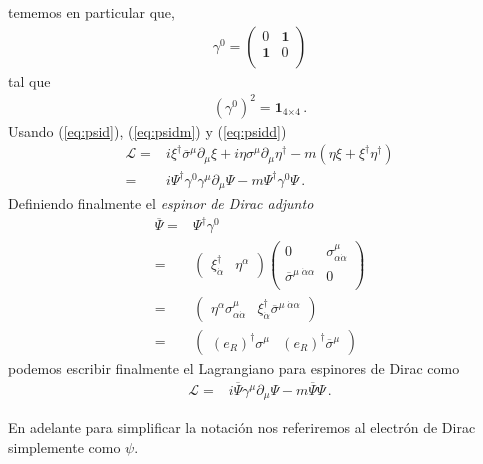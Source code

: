 \begin{frame}
tememos en particular que, 
\begin{align}
  \gamma^0= \begin{pmatrix}
    0           &\boldsymbol{1}\\
    \boldsymbol{1} &0\\
  \end{pmatrix}
\end{align}
tal que
\begin{align}
  \left( \gamma^{0} \right)^2=\boldsymbol{1}_{\text{4$\times 4$}}\,.
\end{align}
Usando (\ref{eq:psid}), (\ref{eq:psidm}) y (\ref{eq:psidd})
\begin{align}
  \mathcal{L}=&i\xi^{\dagger}\overline{\sigma}^{\mu}\partial_{\mu}\xi+i\eta\sigma^{\mu}\partial_{\mu}\eta^{\dagger}
-m \left(\eta\xi+\xi^{\dagger}\eta^{\dagger} \right)\nonumber\\
=&i\Psi^{\dagger}\gamma^{0}\gamma^{\mu}\partial_{\mu}\Psi-m\Psi^{\dagger}\gamma^{0}\Psi\,.
\end{align}
Definiendo finalmente el \emph{espinor de Dirac adjunto}
\begin{align}
  \overline{\Psi}=&\Psi^{\dagger}\gamma^{0}\\
     =& \begin{pmatrix}
  \xi^{\dagger}_{\dot{\alpha}}& \eta^{\alpha}
  \end{pmatrix}
\begin{pmatrix}
   0           &\sigma^{\mu}_{\alpha\dot{\alpha}}\\
    \overline{\sigma}^{\mu\;\dot{\alpha}\alpha} &0\\
  \end{pmatrix}\\
=& \begin{pmatrix}
  \eta^{\alpha}\sigma^{\mu}_{\alpha\dot{\alpha}}&
  \xi^{\dagger}_{\dot{\alpha}}\overline{\sigma}^{\mu\;\dot{\alpha}\alpha}
\end{pmatrix}\\
=& \begin{pmatrix}
  \left(e_R\right)^\dagger \sigma^{\mu}&
\left(e_R\right)^\dagger  \overline{\sigma}^{\mu}
\end{pmatrix}
\end{align}
podemos escribir finalmente el Lagrangiano para espinores de Dirac  como
\begin{align}
\label{eq:115qftnew}
  \mathcal{L}=&i\overline{\Psi}\gamma^{\mu}\partial_{\mu}\Psi-m\overline{\Psi}\Psi\,.
\end{align}
\end{frame}
En adelante para simplificar la notación nos referiremos al electrón de Dirac simplemente como $\psi$.

